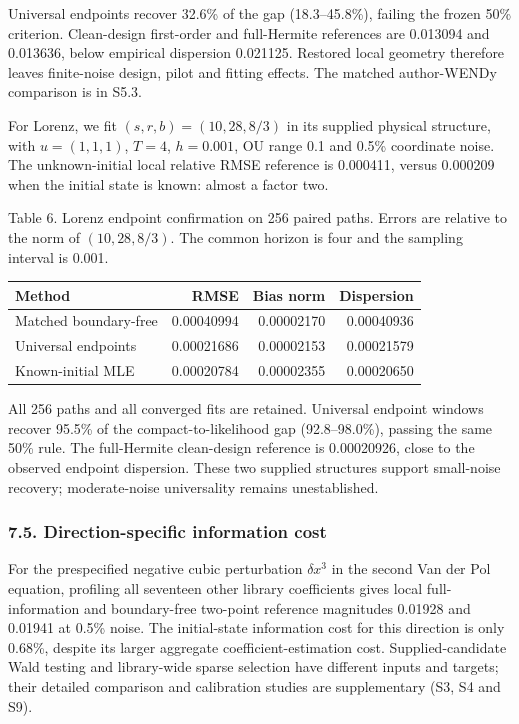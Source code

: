 \documentclass[
  american,
  11pt,
]{article}
\begin{document}
Universal endpoints recover 32.6\% of the gap (18.3--45.8\%), failing
the frozen 50\% criterion. Clean-design first-order and full-Hermite
references are 0.013094 and 0.013636, below empirical dispersion
0.021125. Restored local geometry therefore leaves finite-noise design,
pilot and fitting effects. The matched author-WENDy comparison is in
S5.3.

For Lorenz, we fit \((s,r,b)=(10,28,8/3)\) in its supplied physical
structure, with \(u=(1,1,1)\), \(T=4\), \(h=0.001\), OU range 0.1 and
0.5\% coordinate noise. The unknown-initial local relative RMSE
reference is 0.000411, versus 0.000209 when the initial state is known:
almost a factor two.

\begin{center}
\begin{minipage}{\linewidth}
Table 6. Lorenz endpoint confirmation on 256 paired paths. Errors are
relative to the norm of \((10,28,8/3)\). The common horizon is four and
the sampling interval is 0.001.

\small\setlength{\tabcolsep}{3pt}
\begin{tabular}{@{}lrrr@{}}
\toprule\noalign{}
Method & RMSE & Bias norm & Dispersion \\
\midrule\noalign{}
Matched boundary-free & 0.00040994 & 0.00002170 & 0.00040936 \\
Universal endpoints & 0.00021686 & 0.00002153 & 0.00021579 \\
Known-initial MLE & 0.00020784 & 0.00002355 & 0.00020650 \\
\bottomrule
\end{tabular}
\end{minipage}
\end{center}

All 256 paths and all converged fits are retained. Universal endpoint
windows recover 95.5\% of the compact-to-likelihood gap (92.8--98.0\%),
passing the same 50\% rule. The full-Hermite clean-design reference is
0.00020926, close to the observed endpoint dispersion. These two
supplied structures support small-noise recovery; moderate-noise
universality remains unestablished.

\subsubsection{7.5. Direction-specific information
cost}\label{direction-specific-information-cost}

For the prespecified negative cubic perturbation \(\delta x^3\) in the
second Van der Pol equation, profiling all seventeen other library
coefficients gives local full-information and boundary-free two-point
reference magnitudes 0.01928 and 0.01941 at 0.5\% noise. The
initial-state information cost for this direction is only 0.68\%,
despite its larger aggregate coefficient-estimation cost.
Supplied-candidate Wald testing and library-wide sparse selection have
different inputs and targets; their detailed comparison and calibration
studies are supplementary (S3, S4 and S9).
\end{document}
